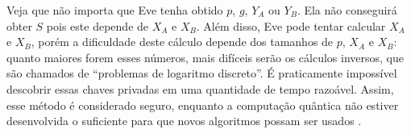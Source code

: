 Veja que não importa que Eve tenha obtido $p$, $g$, $Y_{A}$ ou $Y_{B}$. Ela não
conseguirá obter $S$ pois este depende de $X_{A}$ e $X_{B}$. Além disso, Eve pode
tentar calcular $X_{A}$ e $X_{B}$, porém a dificuldade deste cálculo depende dos
tamanhos de $p$, $X_{A}$ e $X_{B}$: quanto maiores forem esses números, mais difíceis
serão os cálculos inversos, que são chamados de ``problemas de logaritmo discreto''. É
praticamente impossível descobrir essas chaves privadas em uma quantidade de tempo
razoável. Assim, esse método é considerado seguro, enquanto a computação quântica não
estiver desenvolvida o suficiente para que novos algoritmos possam ser usados
\cite{artigo:shor}.